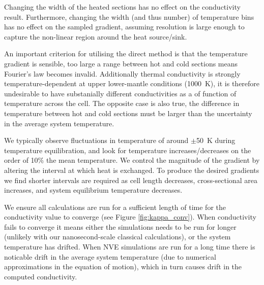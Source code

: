 \documentclass[%
preprint,                                  %
nofootinbib,
 amsmath,amssymb,
 aps,
]{revtex4-1}
\begin{document}
Changing the width of the heated sections has no effect on the conductivity result. Furthermore, changing the width (and thus number) of temperature bins has no effect on the sampled gradient, assuming resolution is large enough to capture the non-linear region around the heat source/sink.

An important criterion for utilising the direct method is that the temperature gradient is sensible, too large a range between hot and cold sections means Fourier's law becomes invalid. Additionally thermal conductivity is strongly temperature-dependent at upper lower-mantle conditions (1000~K), it is therefore undesirable to have substanially different conductivities as a of function of temperature across the cell. The opposite case is also true, the difference in temperature between hot and cold sections must be larger than the uncertainty in the average system temperature. 

We typically observe fluctuations in temperature of around $\pm$50~K during temperature equilibration, and look for temperature increases/decreases on the order of 10\% the mean temperature. We control the magnitude of the gradient by altering the interval at which heat is exchanged. To produce the desired gradients we find shorter intervals are required as cell length decreases, cross-sectional area increases, and system equilibrium temperature decreases. 




We ensure all calculations are run for a sufficient length of time for the conductivity value to converge (see Figure \ref{fig:kappa_conv}). When conductivity fails to converge it means either the simulations needs to be run for longer (unlikely with our nanosecond-scale classical calculations), or the system temperature has drifted. When NVE simulations are run for a long time there is noticable drift in the average system temperature (due to  numerical approximations in the equation of motion), which in turn causes drift in the computed conductivity.
\end{document}
